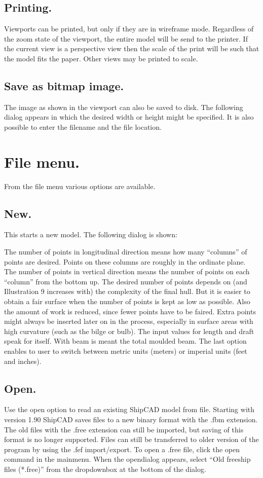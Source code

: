 \documentclass[12pt]{article}
\begin{document}
\subsection{Printing.}
Viewports can be printed, but only if they are in wireframe
mode. Regardless of the zoom state of the viewport, the entire model
will be send to the printer. If the current view is a perspective view
then the scale of the print will be such that the model fits the
paper. Other views may be printed to scale.

\subsection{Save as bitmap image.}
The image as shown in the viewport can also be saved to disk. The
following dialog appears in which the desired width or height might be
specified. It is also possible to enter the filename and the file
location.

\section{File menu.}
From the file menu various options are available.

\subsection{New.}
This starts a new model. The following dialog is shown:

The number of points in longitudinal direction means how many
“columns” of points are desired. Points on these columns are roughly
in the ordinate plane.  The number of points in vertical direction
means the number of points on each “column” from the bottom up. The
desired number of points depends on (and Illustration 9 increases
with) the complexity of the final hull. But it is easier to obtain a
fair surface when the number of points is kept as low as
possible. Also the amount of work is reduced, since fewer points have
to be faired. Extra points might always be inserted later on in the
process, especially in surface areas with high curvature (such as the
bilge or bulb). The input values for length and draft speak for
itself. With beam is meant the total moulded beam. The last option
enables to user to switch between metric units (meters) or imperial
units (feet and inches).

\subsection{Open.}
Use the open option to read an existing ShipCAD model from
file. Starting with version 1.90 ShipCAD saves files to a new binary
format with the .fbm extension. The old files with the .free extension
can still be imported, but saving of this format is no longer
supported. Files can still be transferred to older version of the
program by using the .fef import/export. To open a .free file, click
the open command in the mainmenu. When the opendialog appears, select
“Old freeship files (*.free)” from the dropdownbox at the bottom of
the dialog.
\end{document}
